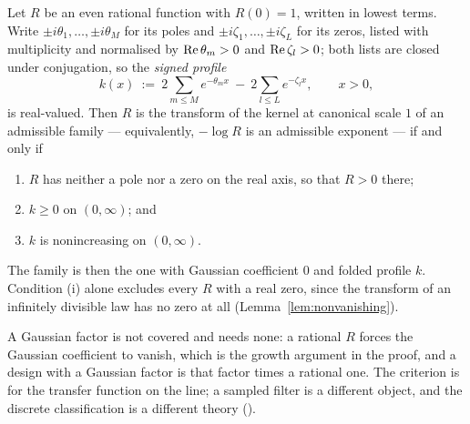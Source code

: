 \begin{proposition}
\label{prop:rational-criterion}
Let $R$ be an even rational function with $R(0) = 1$, written in lowest terms. Write
$\pm i\theta_1,\dots,\pm i\theta_M$ for its poles and $\pm i\zeta_1,\dots,\pm i\zeta_L$ for its
zeros, listed with multiplicity and normalised by $\operatorname{Re}\theta_m > 0$ and $\operatorname{Re}\zeta_l > 0$; both
lists are closed under conjugation, so the \emph{signed profile}
\begin{equation}\label{eq:rational-profile}
  k(x) \ :=\ 2\sum_{m \le M} e^{-\theta_m x} \ -\ 2\sum_{l \le L} e^{-\zeta_l x},
  \qquad x > 0,
\end{equation}
is real-valued. Then $R$ is the transform of the kernel at canonical scale $1$ of an admissible
family --- equivalently, $-\log R$ is an admissible exponent --- if and only if
\begin{enumerate}
\item $R$ has neither a pole nor a zero on the real axis, so that $R > 0$ there;
\item $k \ge 0$ on $(0,\infty)$; and
\item $k$ is nonincreasing on $(0,\infty)$.
\end{enumerate}
The family is then the one with Gaussian coefficient $0$ and folded profile $k$. Condition (i)
alone excludes every $R$ with a real zero, since the transform of an infinitely divisible law has
no zero at all (Lemma~\ref{lem:nonvanishing}).
\end{proposition}

A Gaussian factor is not covered and needs none: a rational $R$ forces the Gaussian coefficient
to vanish, which is the growth argument in the proof, and a design with a Gaussian factor is that
factor times a rational one. The criterion is for the transfer function on the line; a sampled
filter is a different object, and the discrete classification is a different theory
().

